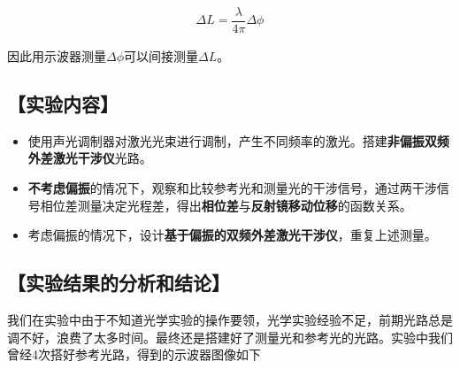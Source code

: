 \documentclass{ctexart}
\let\oldsubsection\subsection
\renewcommand{\subsection}[1]{\oldsubsection{\!\!\!\!\!\!【#1】}}
\begin{document}
\begin{equation*}
  \begin{aligned}
    \Delta L = \dfrac{\lambda}{4 \pi} \Delta \phi
  \end{aligned}
\end{equation*}

因此用示波器测量$\Delta \phi$可以间接测量$\Delta L$。

\subsection{实验内容}

\begin{itemize}
\item 使用声光调制器对激光光束进行调制，产生不同频率的激光。搭建\textbf{非偏振双频外差激光干涉仪}光路。
\item \textbf{不考虑偏振}的情况下，观察和比较参考光和测量光的干涉信号，通过两干涉信号相位差测量决定光程差，得出\textbf{相位差}与\textbf{反射镜移动位移}的函数关系。
\item 考虑偏振的情况下，设计\textbf{基于偏振的双频外差激光干涉仪}，重复上述测量。
\end{itemize}

\subsection{实验结果的分析和结论}

我们在实验中由于不知道光学实验的操作要领，光学实验经验不足，前期光路总是调不好，浪费了太多时间。最终还是搭建好了测量光和参考光的光路。实验中我们曾经4次搭好参考光路，得到的示波器图像如下
\end{document}

